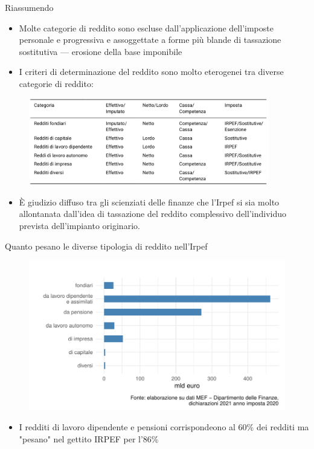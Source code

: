 \documentclass[aspectratio=64,11pt]{beamer}
\newcommand\€{\,\text{€}}
\begin{document}
\begin{frame}{Riassumendo}
\begin{itemize}
\item Molte categorie di reddito sono escluse dall'applicazione dell'imposte
personale e progressiva e assoggettate a forme più blande di tassazione
sostitutiva --- \alert{erosione} della base imponibile
\item I criteri di determinazione del reddito sono molto eterogenei tra diverse
categorie di reddito:
\end{itemize}

\begin{figure}
\centering
\includegraphics[height=3.8cm]{./figure/categorie-di-reddito-Irpef.png}
\end{figure}


\begin{itemize}
\item È giudizio diffuso tra gli scienziati delle finanze che l'Irpef si sia molto
allontanata dall'idea di tassazione del reddito \alert{complessivo} dell'individuo
prevista dell'impianto originario.
\end{itemize}
\end{frame}

\begin{frame}{Quanto pesano le diverse tipologia di reddito nell'Irpef}
\vspace{-3mm}
\begin{figure}
  \includegraphics[width=.9\textwidth]{./figure/redditi-dichiarati-per-tipologia-2020-color.pdf}
\end{figure}

\begin{itemize}
\item I redditi di lavoro dipendente e pensioni corrispondeono al 60\% dei redditi
ma "pesano" nel gettito IRPEF per l'86\%
\end{itemize}
\end{frame}
\end{document}
